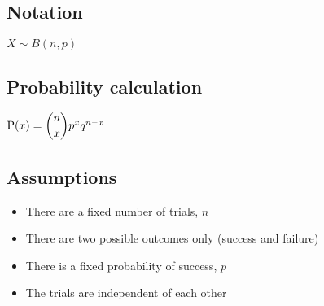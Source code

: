 \subsection{Notation}
$X \sim B(n,p)$
\subsection{Probability calculation}
$\text{P}(x) = \dbinom{n}{x} p^x q^{n-x}$
\subsection{Assumptions}
\begin{itemize}
    \item There are a fixed number of trials, $n$
    \item There are two possible outcomes only (success and failure)
    \item There is a fixed probability of success, $p$
    \item The trials are independent of each other
\end{itemize}
